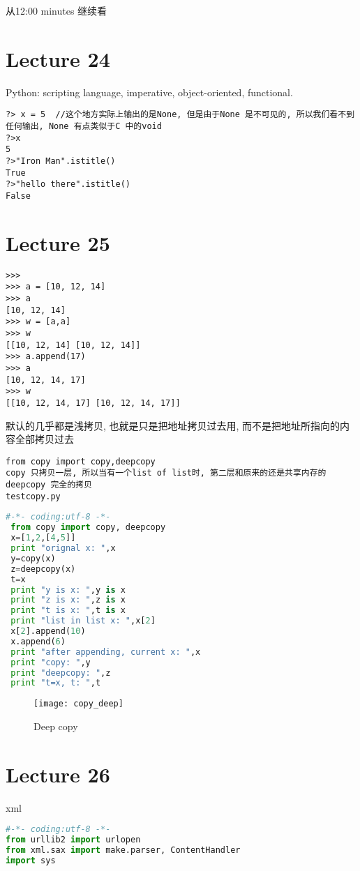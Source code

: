 \documentclass{article}
\begin{document}
从12:00 minutes 继续看

\section{Lecture 24}
Python:
scripting language,
imperative,
object-oriented,
functional.

\begin{verbatim}
?> x = 5  //这个地方实际上输出的是None, 但是由于None 是不可见的, 所以我们看不到任何输出, None 有点类似于C 中的void
?>x
5
?>"Iron Man".istitle()
True
?>"hello there".istitle()
False
\end{verbatim}

\section{Lecture 25}
\begin{verbatim}
>>>
>>> a = [10, 12, 14]
>>> a
[10, 12, 14]
>>> w = [a,a]
>>> w
[[10, 12, 14] [10, 12, 14]]
>>> a.append(17)
>>> a
[10, 12, 14, 17]
>>> w
[[10, 12, 14, 17] [10, 12, 14, 17]]
\end{verbatim}
默认的几乎都是浅拷贝, 也就是只是把地址拷贝过去用, 而不是把地址所指向的内容全部拷贝过去

\begin{verbatim}
from copy import copy,deepcopy
copy 只拷贝一层, 所以当有一个list of list时, 第二层和原来的还是共享内存的
deepcopy 完全的拷贝
testcopy.py
\end{verbatim}

\begin{lstlisting}[language = Python]
#-*- coding:utf-8 -*-
 from copy import copy, deepcopy
 x=[1,2,[4,5]]
 print "orignal x: ",x
 y=copy(x)
 z=deepcopy(x)
 t=x
 print "y is x: ",y is x
 print "z is x: ",z is x
 print "t is x: ",t is x
 print "list in list x: ",x[2]
 x[2].append(10)
 x.append(6)
 print "after appending, current x: ",x
 print "copy: ",y
 print "deepcopy: ",z
 print "t=x, t: ",t
 \end{lstlisting}
\begin{figure}[htbp]
	\centering
	\texttt{[image: copy\_deep]}\\
	\caption{Deep copy}\label{fig.copy.deep}
\end{figure}

\section{Lecture 26}
xml

\begin{lstlisting}[language = Python]
#-*- coding:utf-8 -*-
from urllib2 import urlopen
from xml.sax import make.parser, ContentHandler
import sys
\end{lstlisting}
\end{document}
